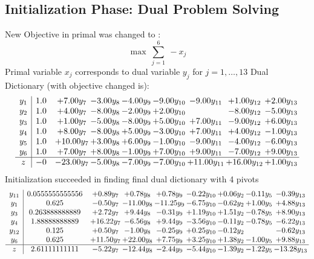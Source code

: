 \documentclass[9pt]{article}
\begin{document}
\subsection{Initialization Phase: Dual Problem Solving}
New Objective in primal was changed to : \[ \max\ \sum_{j=1}^{6}\ - x_j \] 
Primal variable $x_j$ corresponds to dual variable $y_j$ for $j = 1,\ldots,13$
Dual Dictionary (with objective changed is): 
\[\begin{array}{c| c c@{\hskip 2pt} c@{\hskip 2pt} c@{\hskip 2pt} c@{\hskip 2pt} c@{\hskip 2pt} c@{\hskip 2pt} c@{\hskip 2pt} }
 y_{1}   &  1.0 & +  7.00 y_{7} & -3.00 y_{8} & -4.00 y_{9} & -9.00 y_{10} & -9.00 y_{11} & +  1.00 y_{12} & +  2.00 y_{13}\\
 y_{2}   &  1.0 & +  4.00 y_{7} & -8.00 y_{8} & -2.00 y_{9} & +  2.00 y_{10} &   & -8.00 y_{12} & -5.00 y_{13}\\
 y_{3}   &  1.0 & +  1.00 y_{7} & -5.00 y_{8} & -8.00 y_{9} & +  5.00 y_{10} & +  7.00 y_{11} & -9.00 y_{12} & +  6.00 y_{13}\\
 y_{4}   &  1.0 & +  8.00 y_{7} & -8.00 y_{8} & +  5.00 y_{9} & -3.00 y_{10} & +  7.00 y_{11} & +  4.00 y_{12} & -1.00 y_{13}\\
 y_{5}   &  1.0 & + 10.00 y_{7} & +  3.00 y_{8} & +  6.00 y_{9} & -1.00 y_{10} & -9.00 y_{11} & -4.00 y_{12} & -6.00 y_{13}\\
 y_{6}   &  1.0 & +  7.00 y_{7} & +  8.00 y_{8} & -1.00 y_{9} & +  7.00 y_{10} & +  9.00 y_{11} & -7.00 y_{12} & +  9.00 y_{13}\\
\hline
z    &  -0 & -23.00 y_{7} & -5.00 y_{8} & -7.00 y_{9} & -7.00 y_{10} & + 11.00 y_{11} & + 16.00 y_{12} & +  1.00 y_{13}\\
\end{array}\]
Initialization succeeded in finding final dual dictionary with 4 pivots
\[\begin{array}{c| c c@{\hskip 2pt} c@{\hskip 2pt} c@{\hskip 2pt} c@{\hskip 2pt} c@{\hskip 2pt} c@{\hskip 2pt} c@{\hskip 2pt} }
 y_{11}   &  0.0555555555556 & +  0.89 y_{7} & +  0.78 y_{8} & +  0.78 y_{9} & -0.22 y_{10} & +  0.06 y_{2} & -0.11 y_{5} & -0.39 y_{13}\\
 y_{1}   &  0.625 & -0.50 y_{7} & -11.00 y_{8} & -11.25 y_{9} & -6.75 y_{10} & -0.62 y_{2} & +  1.00 y_{5} & +  4.88 y_{13}\\
 y_{3}   &  0.263888888889 & +  2.72 y_{7} & +  9.44 y_{8} & -0.31 y_{9} & +  1.19 y_{10} & +  1.51 y_{2} & -0.78 y_{5} & +  8.90 y_{13}\\
 y_{4}   &  1.88888888889 & + 16.22 y_{7} & -6.56 y_{8} & +  9.44 y_{9} & -3.56 y_{10} & -0.11 y_{2} & -0.78 y_{5} & -6.22 y_{13}\\
 y_{12}   &  0.125 & +  0.50 y_{7} & -1.00 y_{8} & -0.25 y_{9} & +  0.25 y_{10} & -0.12 y_{2} &   & -0.62 y_{13}\\
 y_{6}   &  0.625 & + 11.50 y_{7} & + 22.00 y_{8} & +  7.75 y_{9} & +  3.25 y_{10} & +  1.38 y_{2} & -1.00 y_{5} & +  9.88 y_{13}\\
\hline
z    &  2.61111111111 & -5.22 y_{7} & -12.44 y_{8} & -2.44 y_{9} & -5.44 y_{10} & -1.39 y_{2} & -1.22 y_{5} & -13.28 y_{13}\\
\end{array}\]
\end{document}
